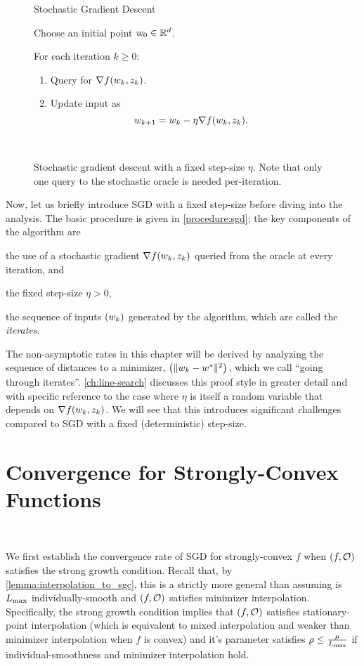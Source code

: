\begin{figure}[t]
\begin{procedure}{Stochastic Gradient Descent}
\item Choose an initial point \( \w_0 \in \R^d \).
\item For each iteration \( k \geq 0 \):
    \begin{enumerate}
        \item Query \oracle{} for \( \grad(\wk, \zk) \).
        \item Update input as\vspace{-1ex}%
            \[ \wkk = \wk - \eta \grad(\wk, \zk). \]
    \end{enumerate}
\end{procedure}
\caption{Stochastic gradient descent with a fixed step-size \( \eta \). Note that only one query to the stochastic oracle is needed per-iteration.}~\label{procedure:sgd}
\end{figure}

Now, let us briefly introduce \ac{SGD} with a fixed step-size before diving into the analysis.
The basic procedure is given in \autoref{procedure:sgd}; the key components of the algorithm are %
\begin{inparaenum}[i)] 
    \item the use of a stochastic gradient \( \grad(\wk, \zk) \) queried from the oracle at every iteration, and
    \item the fixed step-size \( \eta > 0 \),
    \item the sequence of inputs \( \seq{\wk} \) generated by the algorithm, which are called the \emph{iterates}. 
\end{inparaenum}
The non-asymptotic rates in this chapter will be derived by analyzing the sequence of distances to a minimizer, \( \seq{\norm{\wk - \wopt}^2} \), which we call ``going through iterates''. \autoref{ch:line-search} discusses this proof style in greater detail and with specific reference to the case where \( \eta \) is itself a random variable that depends on \( \grad(\wk, \zk) \). We will see that this introduces significant challenges compared to \ac{SGD} with a fixed (deterministic) step-size.

\section{Convergence for Strongly-Convex Functions}~\label{sec:sgd-sc}

We first establish the convergence rate of \ac{SGD} for strongly-convex \( f \) when \( \rbr{f, \oracle} \) satisfies the strong growth condition. 
Recall that, by \autoref{lemma:interpolation_to_sgc}, this is a strictly more general than assuming \oracle{} is \( \Lmax \) individually-smooth and \( \rbr{f, \oracle} \) satisfies minimizer interpolation. 
Specifically, the strong growth condition implies that \( \rbr{f, \oracle{}} \) satisfies stationary-point interpolation (which is equivalent to mixed interpolation and weaker than minimizer interpolation when \( f \) is convex) and it's parameter satisfies \( \rho \leq \frac{\mu}{\Lmax} \) if individual-smoothness and minimizer interpolation hold. 

